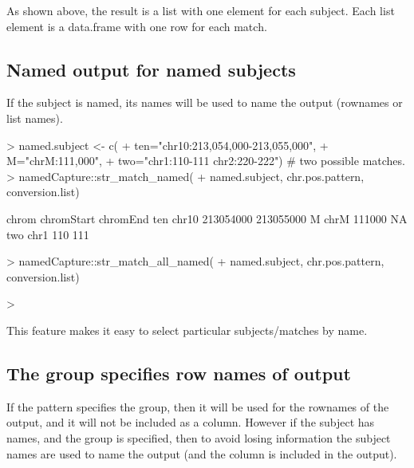 As shown above, the result is a list with one element for
each subject. Each list element is a data.frame with one row for each
match.

\subsection{Named output for named subjects}

If the subject is named, its names will be used to name the output
(rownames or list names).

\begin{Schunk}
\begin{Sinput}
> named.subject <- c(
+   ten="chr10:213,054,000-213,055,000",
+   M="chrM:111,000",
+   two="chr1:110-111 chr2:220-222") # two possible matches.
> namedCapture::str_match_named(
+   named.subject, chr.pos.pattern, conversion.list)
\end{Sinput}
\begin{Soutput}
    chrom chromStart  chromEnd
ten chr10  213054000 213055000
M    chrM     111000        NA
two  chr1        110       111
\end{Soutput}
\begin{Sinput}
> namedCapture::str_match_all_named(
+   named.subject, chr.pos.pattern, conversion.list)
\end{Sinput}
\begin{Sinput}
> 
\end{Sinput}
\end{Schunk}

This feature makes it easy to select particular subjects/matches by
name. 

\subsection{The  group specifies row names of output}

If the pattern specifies the  group, then it will be used
for the rownames of the output, and it will not be included as a
column. However if the subject has names, and the  group is
specified, then to avoid losing information the subject names are used
to name the output (and the  column is included in the
output).

